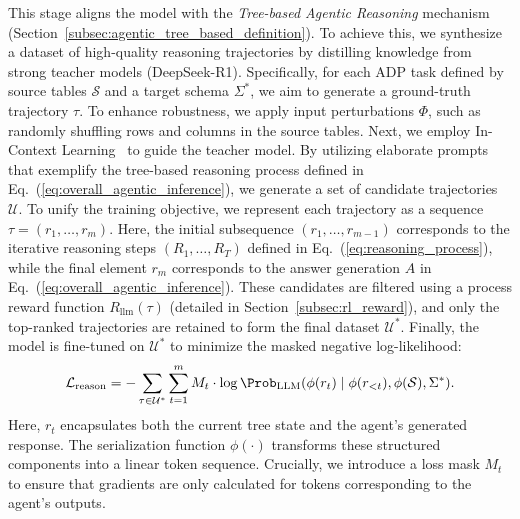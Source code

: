 This stage aligns the model with the \textit{Tree-based Agentic Reasoning} mechanism (Section~\ref{subsec:agentic_tree_based_definition}).
To achieve this, we synthesize a dataset of high-quality reasoning trajectories by distilling knowledge from strong teacher models (\eg DeepSeek-R1).
Specifically, for each ADP task defined by source tables $\mathcal{S}$ and a target schema $\Sigma^\ast$, we aim to generate a ground-truth trajectory $\tau$.
To enhance robustness, we apply input perturbations $\Phi$, such as randomly shuffling rows and columns in the source tables.
Next, we employ In-Context Learning~\cite{dong2024survey} to guide the teacher model. By utilizing elaborate prompts that exemplify the tree-based reasoning process defined in Eq.~(\ref{eq:overall_agentic_inference}), we generate a set of candidate trajectories $\mathcal{U}$.
To unify the training objective, we represent each trajectory as a sequence $\tau = (r_1, \dots, r_m)$. Here, the initial subsequence $(r_1, \dots, r_{m-1})$ corresponds to the iterative reasoning steps $(R_1, \dots, R_T)$ defined in Eq.~(\ref{eq:reasoning_process}), while the final element $r_m$ corresponds to the answer generation $A$ in Eq.~(\ref{eq:overall_agentic_inference}).
These candidates are filtered using a process reward function $R_{\text{llm}}(\tau)$ (detailed in Section~\ref{subsec:rl_reward}), and only the top-ranked trajectories are retained to form the final dataset $\mathcal{U}^\ast$.
Finally, the model is fine-tuned on $\mathcal{U}^\ast$ to minimize the masked negative log-likelihood:
%
\begin{equation}
\label{eq:sft_reasoning_learn}
\mathcal{L}_{\text{reason}} 
= - \sum_{\tau \in \mathcal{U}^\ast} 
\sum_{t=1}^{m} M_t \cdot \log \Prob_{\text{LLM}}(\phi(r_t) \mid \phi(r_{<t}), \phi(\mathcal{S}), \Sigma^\ast).
\end{equation}
%
Here, $r_t$ encapsulates both the current tree state and the agent's generated response. The serialization function $\phi(\cdot)$ transforms these structured components into a linear token sequence.
Crucially, we introduce a loss mask $M_t$ to ensure that gradients are only calculated for tokens corresponding to the agent's outputs.


